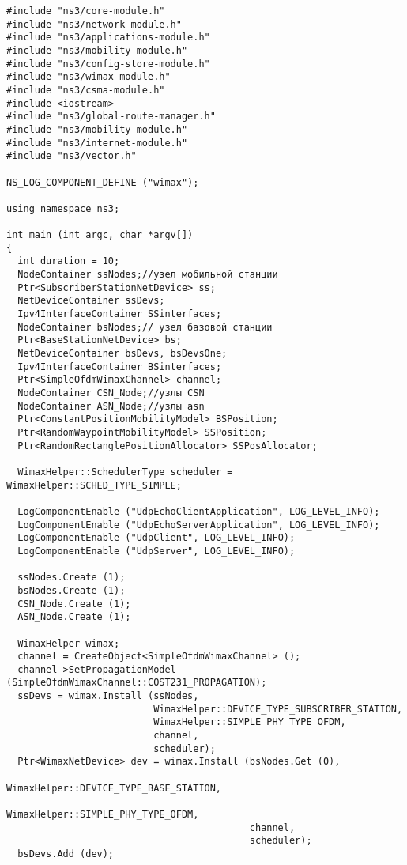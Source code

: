 \documentclass[14pt,a4paper]{article}
\begin{document}
 {\small \begin{verbatim}
#include "ns3/core-module.h"
#include "ns3/network-module.h"
#include "ns3/applications-module.h"
#include "ns3/mobility-module.h"
#include "ns3/config-store-module.h"
#include "ns3/wimax-module.h"
#include "ns3/csma-module.h"
#include <iostream>
#include "ns3/global-route-manager.h"
#include "ns3/mobility-module.h"
#include "ns3/internet-module.h"
#include "ns3/vector.h"

NS_LOG_COMPONENT_DEFINE ("wimax");

using namespace ns3;

int main (int argc, char *argv[])
{
  int duration = 10;
  NodeContainer ssNodes;//узел мобильной станции
  Ptr<SubscriberStationNetDevice> ss;
  NetDeviceContainer ssDevs;
  Ipv4InterfaceContainer SSinterfaces;
  NodeContainer bsNodes;// узел базовой станции
  Ptr<BaseStationNetDevice> bs;
  NetDeviceContainer bsDevs, bsDevsOne;
  Ipv4InterfaceContainer BSinterfaces;
  Ptr<SimpleOfdmWimaxChannel> channel;
  NodeContainer CSN_Node;//узлы CSN
  NodeContainer ASN_Node;//узлы asn
  Ptr<ConstantPositionMobilityModel> BSPosition;
  Ptr<RandomWaypointMobilityModel> SSPosition;
  Ptr<RandomRectanglePositionAllocator> SSPosAllocator;

  WimaxHelper::SchedulerType scheduler = WimaxHelper::SCHED_TYPE_SIMPLE;

  LogComponentEnable ("UdpEchoClientApplication", LOG_LEVEL_INFO);
  LogComponentEnable ("UdpEchoServerApplication", LOG_LEVEL_INFO);
  LogComponentEnable ("UdpClient", LOG_LEVEL_INFO);
  LogComponentEnable ("UdpServer", LOG_LEVEL_INFO);

  ssNodes.Create (1);
  bsNodes.Create (1);
  CSN_Node.Create (1);
  ASN_Node.Create (1);

  WimaxHelper wimax;
  channel = CreateObject<SimpleOfdmWimaxChannel> ();
  channel->SetPropagationModel (SimpleOfdmWimaxChannel::COST231_PROPAGATION);
  ssDevs = wimax.Install (ssNodes,
                          WimaxHelper::DEVICE_TYPE_SUBSCRIBER_STATION,
                          WimaxHelper::SIMPLE_PHY_TYPE_OFDM,
                          channel,
                          scheduler);
  Ptr<WimaxNetDevice> dev = wimax.Install (bsNodes.Get (0),
                                           WimaxHelper::DEVICE_TYPE_BASE_STATION,
                                           WimaxHelper::SIMPLE_PHY_TYPE_OFDM,
                                           channel,
                                           scheduler);
  bsDevs.Add (dev);


\end{verbatim}}
\end{document}
